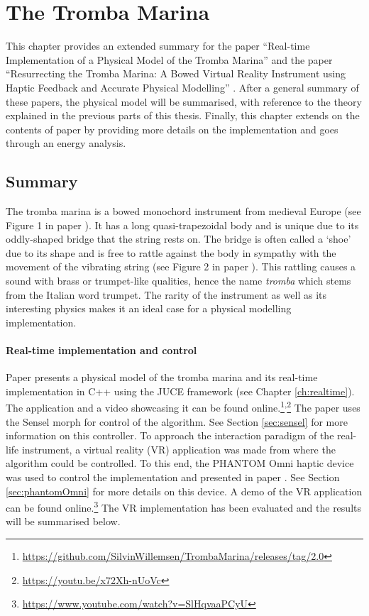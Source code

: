 \chapter{The Tromba Marina}\label{ch:tromba}
This chapter provides an extended summary for the paper ``Real-time Implementation of a Physical Model of the Tromba Marina'' \citeP[D] and the paper ``Resurrecting the Tromba Marina: A Bowed Virtual Reality Instrument using Haptic Feedback and Accurate Physical Modelling'' \citeP[E]. After a general summary of these papers, the physical model will be summarised, with reference to the theory explained in the previous parts of this thesis. Finally, this chapter extends on the contents of paper \citeP[D] by providing more details on the implementation and goes through an energy analysis.

\section{Summary}
The tromba marina is a bowed monochord instrument from medieval Europe (see Figure 1 in paper \citeP[D]). It has a long quasi-trapezoidal body and is unique due to its oddly-shaped bridge that the string rests on. The bridge is often called a `shoe' due to its shape and is free to rattle against the body in sympathy with the movement of the vibrating string (see Figure 2 in paper \citeP[D]). This rattling causes a sound with brass or trumpet-like qualities, hence the name \textit{tromba} which stems from the Italian word trumpet. The rarity of the instrument as well as its interesting physics makes it an ideal case for a physical modelling implementation.

\subsubsection{Real-time implementation and control}
Paper \citeP[D] presents a physical model of the tromba marina and its real-time implementation in C++ using the JUCE framework (see Chapter \ref{ch:realtime}). The application and a video showcasing it can be found online.\footnote{\url{https://github.com/SilvinWillemsen/TrombaMarina/releases/tag/2.0}}\textsuperscript{,}\footnote{\url{https://youtu.be/x72Xh-nUoVc}} The paper uses the Sensel morph for control of the algorithm. See Section \ref{sec:sensel} for more information on this controller. To approach the interaction paradigm of the real-life instrument, a virtual reality (VR) application was made from where the algorithm could be controlled. To this end, the PHANTOM Omni haptic device was used to control the implementation and presented in paper \citeP[E]. See Section \ref{sec:phantomOmni} for more details on this device. A demo of the VR application can be found  online.\footnote{\url{https://www.youtube.com/watch?v=SlHqvaaPCyU}} The VR implementation has been evaluated and the results will be summarised below.

